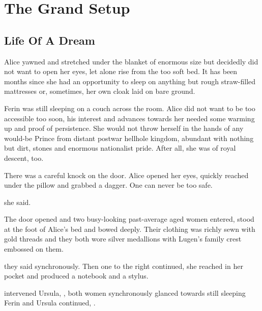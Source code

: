 \chapter{The Grand Setup}

\section{Life Of A Dream}

Alice yawned and stretched under the blanket of enormous size but decidedly did not want to open her eyes, let alone rise from the too soft bed. It has been months since she had an opportunity to sleep on anything but rough straw-filled mattresses or, sometimes, her own cloak laid on bare ground.

Ferin was still sleeping on a couch across the room. Alice did not want to be too accessible too soon, his interest and advances towards her needed some warming up and proof of persistence. She would not throw herself in the hands of any would-be Prince from distant postwar hellhole kingdom, abundant with nothing but dirt, stones and enormous nationalist pride. After all, she was of royal descent, too.

There was a careful knock on the door. Alice opened her eyes, quickly reached under the pillow and grabbed a dagger. One can never be too safe.

 she said.

The door opened and two busy-looking past-average aged women entered, stood at the foot of Alice's bed and bowed deeply. Their clothing was richly sewn with gold threads and they both wore silver medallions with Lugen's family crest embossed on them.

 they said synchronously. Then one to the right continued,  she reached in her pocket and produced a notebook and a stylus. 

 intervened Ursula, , both women synchronously glanced towards still sleeping Ferin and Ursula continued, .

